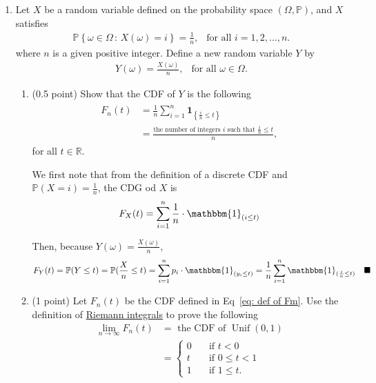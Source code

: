 \documentclass[11pt,letterpaper, leqno]{article}
\renewcommand{\P}{\mathbb{P}}
\renewcommand{\qed}{\quad \blacksquare}
\newcommand{\ind}{\mathbbm{1}}
\begin{document}
\begin{enumerate}
\pagebreak
\item Let $X$ be a random variable defined on the probability space $(\Omega,\mathbb{P})$, and $X$ satisfies 
\begin{align*}
    \mathbb{P}\left\{ \omega\in\Omega \,:\, X(\omega)=i\right\} = \frac{1}{n}, \ \ \mbox{ for all }i=1,2,\ldots,n.
\end{align*}
where $n$ is a given positive integer. Define a new random variable $Y$ by
    \begin{align*}
        Y(\omega)=\frac{X(\omega)}{n},\ \ \mbox{ for all }\omega\in\Omega.
    \end{align*}
\begin{enumerate}
    \item (0.5 point) Show that the CDF of $Y$ is the following
\begin{align}\label{eq: def of Fm}
    \begin{aligned}
        F_n(t) &=\frac{1}{n}\sum_{i=1}^n\mathbf{1}_{\left\{\frac{i}{n} \le t\right\} } \\
        & =\frac{\mbox{the number of integers $i$ such that $\frac{i}{n}\le t$}}{n},
    \end{aligned}
\end{align}
for all $t\in\mathbb{R}$. 

\color{blue}
    We first note that from the definition of a discrete CDF and $\P(X = i) = \frac{1}{n}$, the CDG od $X$ is 
    \[F_X(t) = \sum_{i=1}^n \frac{1}{n}\cdot \ind_{(i \leq t)}\]

    Then, because $Y(\omega) = \frac{X(\omega)}{n}$, 
    \begin{align*}
        F_Y(t) &= \P(Y \leq t) = \P(\frac{X}{n} \leq t) = \sum_{i=1}^n p_i \cdot \ind_{(y_i \leq t)} = \frac{1}{n}\sum_{i=1}^n \ind_{(\frac{i}{n} \leq t)} \qed
    \end{align*}
\color{black}

\item (1 point) Let $F_n(t)$ be the CDF defined in Eq~\eqref{eq: def of Fm}. Use the definition of \href{https://en.wikipedia.org/wiki/Riemann_integral}{Riemann integrals} to prove the following
\begin{align*}
    \lim_{n\rightarrow\infty} F_n(t) &= \mbox{ the CDF of }\operatorname{Unif}(0,1) \\
    & = \left\{
    \begin{aligned}
    0 \ \ \ & \mbox{ if } t<0\\
    t \ \ \ & \mbox{ if } 0\le t < 1\\
    1 \ \ \ & \mbox{ if } 1\le t.
    \end{aligned}
    \right.
\end{align*}


\end{enumerate}
\end{enumerate}
\end{document}
